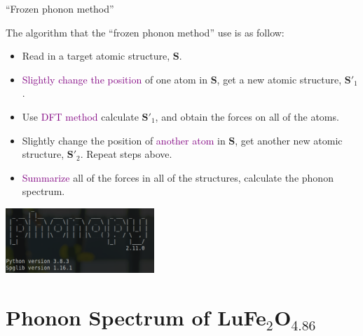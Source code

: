 \documentclass{beamer}
\begin{document}
\begin{frame}{``Frozen phonon method''}
  \begin{block}{}
    The algorithm that the ``frozen phonon method'' use is as follow:
  \begin{itemize}
    \item Read in a target atomic structure, \(\bm{S}\).
    \item \textcolor{purple}{Slightly change the position} of one atom in \(\bm{S}\), get a new atomic structure, \(\bm{S}'_1\).
    \item Use \textcolor{purple}{DFT method} calculate \(\bm{S}'_1\), and obtain the forces on all of the atoms.
    \item Slightly change the position of \textcolor{purple}{another atom} in \(\bm{S}\), get another new atomic structure, \(\bm{S}'_2\). Repeat steps above.
    \item \textcolor{purple}{Summarize} all of the forces in all of the structures, calculate the phonon spectrum.
  \end{itemize}
  \end{block}
  \begin{center}
    \includegraphics[width=0.42\textwidth]{figure/phonopy.png}
  \end{center}
\end{frame}

\section{Phonon Spectrum of LuFe\(_2\)O\(_{4.86}\)}
\end{document}
